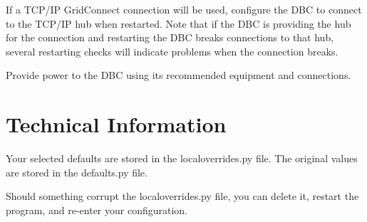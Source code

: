 \documentclass[11pt]{article}
\begin{document}
If a TCP/IP GridConnect connection will be used, 
configure the DBC to connect to the TCP/IP hub when restarted. Note that if 
the DBC is providing the hub for the connection and restarting the DBC
breaks connections to that hub, several restarting checks will indicate problems
when the connection breaks.

Provide power to the DBC using its recommended equipment and connections.


\section{Technical Information}

Your selected defaults are stored in the localoverrides.py file.
The original values are stored in the defaults.py file.

Should something corrupt the localoverrides.py file,
you can delete it, restart the program, and re-enter your configuration.
\end{document}
